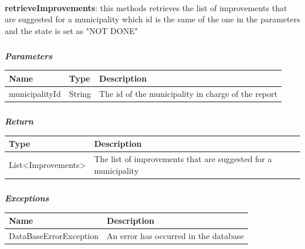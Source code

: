 					\paragraph{}
							\textbf{retrieveImprovements}: this methods retrieves the list of improvements that are suggested for a municipality which id is the same of the one in the parameters  and the state is set as "NOT DONE"
							\subparagraph{}
							\vspace{-3mm}
							\textit{\textbf{Parameters}}
								\begin{table}[!h]
									\begin{tabular}{L{0.2\textwidth}L{0.15\textwidth}L{0.45\textwidth}}
										\toprule
										\textbf{Name} & \textbf{Type} & \textbf{Description} \\
										\midrule
								  		municipalityId & String & The id of the municipality in charge of the report \\
								 		\bottomrule
									\end{tabular}
								\end{table}
							\subparagraph{}
							\vspace{-6mm}
								\textit{\textbf{Return}}
								\vspace{-2mm}
									\begin{table}[!h]
									\begin{tabular}{L{0.3\textwidth}L{0.5\textwidth}}
										\toprule
										\textbf{Type} & \textbf{Description} \\
										\midrule
								  		List<Improvements> & The list of improvements that are suggested for a municipality \\
								 		\bottomrule
									\end{tabular}
								\end{table}
							\clearpage
							\subparagraph{}
								\textit{\textbf{Exceptions}}
								\vspace{-2mm}
									\begin{table}[!h]
									\begin{tabular}{ll}
										\toprule
										\textbf{Name} & \textbf{Description} \\
										\midrule
								  		DataBaseErrorException & An error has occurred in the database \\ 
								 		\bottomrule
									\end{tabular}
								\end{table}
								
